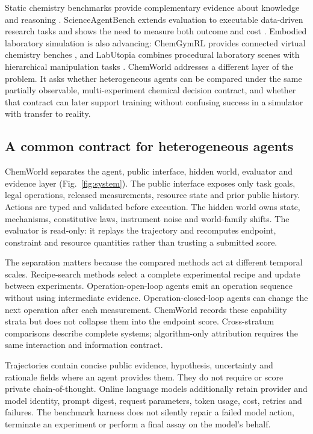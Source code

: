 \documentclass[11pt]{article}
\begin{document}
Static chemistry benchmarks provide complementary evidence about knowledge and reasoning \citep{jablonka2024predictive,schneider2024chembench}. ScienceAgentBench extends evaluation to executable data-driven research tasks and shows the need to measure both outcome and cost \citep{chen2025scienceagentbench}. Embodied laboratory simulation is also advancing: ChemGymRL provides connected virtual chemistry benches \citep{beeler2024chemgymrl}, and LabUtopia combines procedural laboratory scenes with hierarchical manipulation tasks \citep{li2025labutopia}. ChemWorld addresses a different layer of the problem. It asks whether heterogeneous agents can be compared under the same partially observable, multi-experiment chemical decision contract, and whether that contract can later support training without confusing success in a simulator with transfer to reality.

\subsection*{A common contract for heterogeneous agents}

ChemWorld separates the agent, public interface, hidden world, evaluator and evidence layer (Fig.~\ref{fig:system}). The public interface exposes only task goals, legal operations, released measurements, resource state and prior public history. Actions are typed and validated before execution. The hidden world owns state, mechanisms, constitutive laws, instrument noise and world-family shifts. The evaluator is read-only: it replays the trajectory and recomputes endpoint, constraint and resource quantities rather than trusting a submitted score.

The separation matters because the compared methods act at different temporal scales. Recipe-search methods select a complete experimental recipe and update between experiments. Operation-open-loop agents emit an operation sequence without using intermediate evidence. Operation-closed-loop agents can change the next operation after each measurement. ChemWorld records these capability strata but does not collapse them into the endpoint score. Cross-stratum comparisons describe complete systems; algorithm-only attribution requires the same interaction and information contract.

Trajectories contain concise public evidence, hypothesis, uncertainty and rationale fields where an agent provides them. They do not require or score private chain-of-thought. Online language models additionally retain provider and model identity, prompt digest, request parameters, token usage, cost, retries and failures. The benchmark harness does not silently repair a failed model action, terminate an experiment or perform a final assay on the model's behalf.
\end{document}
